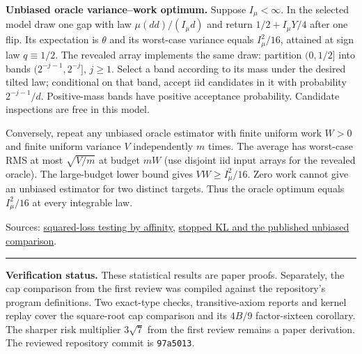 \documentclass[11pt]{article}
\newcommand{\src}[2]{\href{https://github.com/davidiach/adaptive-threshold-estimation/blob/97a501383083cc0fa64cb96405444048b8fd4053/#1}{#2}}
\begin{document}
\textbf{Unbiased oracle variance--work optimum.} Suppose $I_\mu<\infty$. In the selected model draw one gap with law $\mu(dd)/(I_\mu d)$ and return $1/2+I_\mu Y/4$ after one flip. Its expectation is $\theta$ and its worst-case variance equals $I_\mu^2/16$, attained at sign law $q\equiv1/2$. The revealed array implements the same draw: partition $(0,1/2]$ into bands $(2^{-j-1},2^{-j}]$, $j\ge1$. Select a band according to its mass under the desired tilted law; conditional on that band, accept iid candidates in it with probability $2^{-j-1}/d$. Positive-mass bands have positive acceptance probability. Candidate inspections are free in this model.

Conversely, repeat any unbiased oracle estimator with finite uniform work $W>0$ and finite uniform variance $V$ independently $m$ times. The average has worst-case RMS at most $\sqrt{V/m}$ at budget $mW$ (use disjoint iid input arrays for the revealed oracle). The large-budget lower bound gives $VW\ge I_\mu^2/16$. Zero work cannot give an unbiased estimator for two distinct targets. Thus the oracle optimum equals $I_\mu^2/16$ at every integrable law.

{\small Sources: \src{paper/v6/appendix-dual.tex}{squared-loss testing by affinity},
\src{paper/v6/core.tex}{stopped KL and the published unbiased comparison}.}

\vspace{5pt}\hrule\vspace{5pt}
{\small\textbf{Verification status.} These statistical results are paper proofs. Separately, the cap comparison from the first review was compiled against the repository's program definitions. Two exact-type checks, transitive-axiom reports and kernel replay cover the square-root cap comparison and its $4B/9$ factor-sixteen corollary. The sharper risk multiplier $3\sqrt7$ from the first review remains a paper derivation. The reviewed repository commit is \texttt{97a5013}.}
\end{document}
